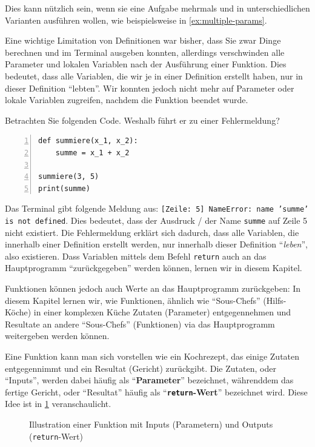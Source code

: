 Dies kann nützlich sein, wenn sie eine Aufgabe mehrmals und in unterschiedlichen Varianten ausführen wollen, wie beispielsweise in \cref{ex:multiple-params}.

Eine wichtige Limitation von Definitionen war bisher, dass Sie zwar Dinge berechnen und im Terminal ausgeben konnten, allerdings verschwinden alle Parameter und lokalen Variablen nach der Ausführung einer Funktion.  Dies bedeutet, dass alle Variablen, die wir je in einer Definition erstellt haben, nur in dieser Definition \enquote{lebten}. Wir konnten jedoch nicht mehr auf Parameter oder lokale Variablen zugreifen, nachdem die Funktion beendet wurde.

\begin{myexample}\label{ex:sum-noreturn}
Betrachten Sie folgenden Code. Weshalb führt er zu einer Fehlermeldung?
\begin{lstlisting}[numbers=left]
def summiere(x_1, x_2):
    summe = x_1 + x_2
    
summiere(3, 5)
print(summe)
\end{lstlisting}
Das Terminal gibt folgende Meldung aus: \texttt{[Zeile: 5] NameError: name 'summe' is not defined}. Dies bedeutet, dass der Ausdruck / der Name \lstinline|summe| auf Zeile 5 nicht existiert. Die Fehlermeldung erklärt sich dadurch, dass alle Variablen, die innerhalb einer Definition erstellt werden, nur innerhalb dieser Definition \enquote{\textit{leben}}, also existieren. Dass Variablen mittels dem Befehl \lstinline|return| auch an das Hauptprogramm \enquote{zurückgegeben} werden können, lernen wir in diesem Kapitel.
\end{myexample}

Funktionen können jedoch auch Werte an das Hauptprogramm zurückgeben: In diesem Kapitel lernen wir, wie Funktionen, ähnlich wie \enquote{Sous-Chefs} (Hilfs-Köche) in einer komplexen Küche Zutaten (Parameter) entgegennehmen und Resultate an andere \enquote{Sous-Chefs} (Funktionen) via das Hauptprogramm weitergeben werden können.

Eine Funktion kann man sich vorstellen wie ein Kochrezept, das einige Zutaten entgegennimmt und ein Resultat (Gericht) zurückgibt. Die Zutaten, oder \enquote{Inputs}, werden dabei häufig als \enquote{\textbf{Parameter}} bezeichnet, währenddem das fertige Gericht, oder \enquote{Resultat} häufig als \enquote{\textbf{\lstinline|return|-Wert}} bezeichnet wird. Diese Idee ist in \cref{fig:funktion-einzeln} veranschaulicht.

\begin{figure}[H]
	\centering
	\caption{Illustration einer Funktion mit Inputs (Parametern) und Outputs (\lstinline|return|-Wert)}
	\label{fig:funktion-einzeln}
\end{figure}

